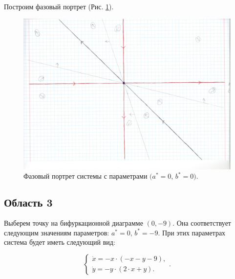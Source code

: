 Построим фазовый портрет (Рис. \ref{fig:phportr02}).
\newpage
\begin{figure}[h]
	\includegraphics[width=\textwidth]{phptr/(0, 0).jpg}
	\centering
	\caption{\label{fig:phportr02} Фазовый портрет системы с параметрами $(a^\ast = 0$, $b^\ast = 0)$.}
\end{figure}

\subsection{Область 3}

Выберем точку на бифуркационной диаграмме $(0, -9)$. Она соответствует следующим значениям параметров:  $a^\ast = 0$, $b^\ast = -9$. При этих параметрах система будет иметь следующий вид: 

$$
\left \lbrace 
\begin{matrix} 
	\dot{x} = -x \cdot (-x - y - 9), \\
	\dot{y} = -y \cdot (2 \cdot x + y). \
\end{matrix} 
\right . .$$


